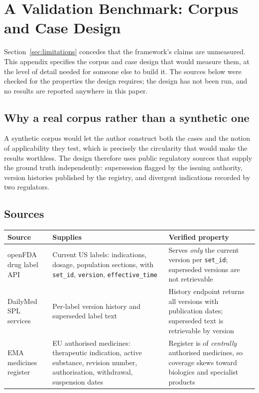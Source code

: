 \section{A Validation Benchmark: Corpus and Case Design}
\label{sec:benchmark}

Section~\ref{sec:limitations} concedes that the framework's claims are unmeasured. This
appendix specifies the corpus and case design that would measure them, at the level of
detail needed for someone else to build it. The sources below were checked for the
properties the design requires; the design has not been run, and no results are reported
anywhere in this paper.

\subsection{Why a real corpus rather than a synthetic one}

A synthetic corpus would let the author construct both the cases and the notion of
applicability they test, which is precisely the circularity that would make the results
worthless. The design therefore uses public regulatory sources that supply the ground
truth independently: supersession flagged by the issuing authority, version histories
published by the registry, and divergent indications recorded by two regulators.

\subsection{Sources}

\begin{center}
\small
\begin{tabular}{@{}>{\raggedright\arraybackslash}p{3.0cm}>{\raggedright\arraybackslash}p{5.4cm}>{\raggedright\arraybackslash}p{5.6cm}@{}}
\toprule
Source & Supplies & Verified property \\
\midrule
openFDA drug label API
  & Current US labels: indications, dosage, population sections, with
    \texttt{set\_id}, \texttt{version}, \texttt{effective\_time}
  & Serves \emph{only} the current version per \texttt{set\_id}; superseded versions are
    not retrievable \\
\addlinespace
DailyMed SPL services
  & Per-label version history and superseded label text
  & History endpoint returns all versions with publication dates; superseded text is
    retrievable by version \\
\addlinespace
EMA medicines register
  & EU authorised medicines: therapeutic indication, active substance, revision number,
    authorisation, withdrawal, suspension dates
  & Register is of \emph{centrally} authorised medicines, so coverage skews toward
    biologics and specialist products \\
\bottomrule
\end{tabular}
\end{center}

